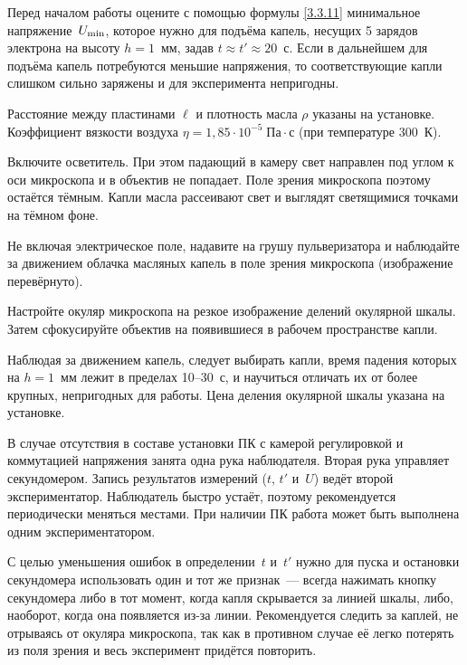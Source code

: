 \begin{lab:task}

    
\item Перед началом работы оцените с помощью формулы \eqref{3.3.11} 
минимальное напряжение~$U_{\rm min}$, которое нужно для подъёма капель, 
несущих 5 зарядов электрона на высоту $h=1$~мм, задав $t\approx t' \approx 20$~с. 
Если в дальнейшем для подъёма капель потребуются меньшие напряжения, 
то соответствующие капли слишком сильно заряжены и для эксперимента непригодны.

Расстояние между пластинами $\ell$ и плотность масла $\rho$ указаны на установке.
Коэффициент вязкости воздуха $\eta=1,85\cdot 10^{-5}\;\text{Па}\cdot \text{с}$
(при температуре 300~К).

\item Включите осветитель. При этом падающий в камеру свет направлен под углом к
оси микроскопа и в объектив не попадает. Поле зрения микроскопа поэтому 
остаётся тёмным. Капли масла рассеивают свет и 
выглядят светящимися точками на тёмном фоне.

Не включая электрическое поле,  надавите на грушу
пульверизатора  и наблюдайте за движением облачка масляных капель в поле зрения
микроскопа (изображение перевёрнуто).

\item Настройте окуляр микроскопа на резкое изображение делений окулярной шкалы.
Затем сфокусируйте объектив на появившиеся в рабочем пространстве капли.

\item Наблюдая за движением капель, следует выбирать капли, время падения
которых на $h=1$~мм лежит в пределах 10--30~с, и научиться отличать 
их от более крупных, непригодных для работы. Цена деления окулярной шкалы 
указана на установке.

В случае отсутствия в составе установки ПК с камерой регулировкой и коммутацией
напряжения занята одна рука наблюдателя. Вторая рука управляет секундомером.
Запись результатов измерений ($t$, $t'$ и~$U$) ведёт второй экспериментатор.
Наблюдатель быстро устаёт, поэтому рекомендуется периодически меняться местами.
При наличии ПК работа может быть выполнена одним экспериментатором.

С целью уменьшения ошибок в определении~$t$ и~$t'$ нужно для пуска и остановки
секундомера использовать один и тот же признак~--- всегда нажимать 
кнопку секундомера либо в тот момент, когда капля скрывается за линией шкалы, либо,
наоборот, когда она появляется из-за линии. Рекомендуется следить за каплей, не
отрываясь от окуляра микроскопа, так как в противном случае её легко потерять из
поля зрения и весь эксперимент придётся повторить.


\end{lab:task}
